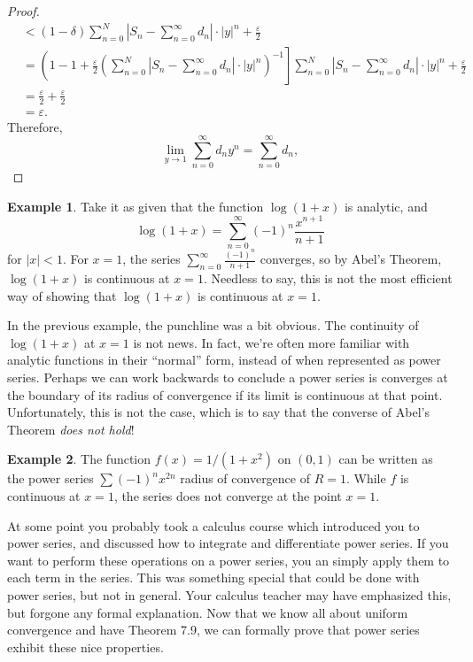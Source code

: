 \documentclass{article}
\theoremstyle{definition}
\newtheorem{example}{Example}[section]
\begin{document}
\begin{proof}
\begin{align*}
			&< (1-\delta)\sum_{n=0}^{N}\left\lvert S_n-\sum_{n=0}^{\infty}d_n \right\rvert\cdot|y|^n + \frac{\varepsilon}{2}\\
			& = \left(1-1 + \frac{\varepsilon}{2}\left(\sum_{n=0}^{N}\left\lvert S_n-\sum_{n=0}^{\infty}d_n \right\rvert\cdot|y|^n\right)^{-1}\right]\sum_{n=0}^{N}\left\lvert S_n-\sum_{n=0}^{\infty}d_n \right\rvert\cdot|y|^n + \frac{\varepsilon}{2}\\ & = 
			\frac{\varepsilon}{2} + \frac{\varepsilon}{2}\\
			& = \varepsilon.
		\end{align*}
		Therefore, $$ \lim\limits_{y\to 1}\sum_{n=0}^{\infty}d_ny^n= \sum_{n=0}^{\infty}d_n,$$
	\end{proof}
	
	\begin{example}
		Take it as given that the function $ \log(1+x) $ is analytic, and $$ \log(1+x)=\sum_{n=0}^{\infty}(-1)^{n}\frac{x^{n+1}}{n+1}$$ for $ |x|<1 $. For $ x=1 $,  the series $\sum_{n=0}^{\infty}\frac{(-1)^{n}}{n+1}$ converges, so by Abel's Theorem, $ \log(1+x) $ is continuous at $ x = 1 $. Needless to say, this is not the most efficient way of showing that $ \log(1+x) $ is continuous at $ x = 1 $.   
	\end{example}
	
	In the previous example, the punchline was a bit obvious. The continuity of $ \log(1+x) $ at $ x = 1 $ is not news. In fact, we're often more familiar with analytic functions in their ``normal'' form, instead of when represented as power series. Perhaps we can work backwards to conclude a power series is converges at the boundary of its radius of convergence if its limit is continuous at that point. Unfortunately, this is not the case, which is to say that the converse of Abel's Theorem \textit{does not hold}! 
	
	\begin{example}
		The function $ f(x)= 1/(1+x^2) $ on $ (0,1) $ can be written as the power series $ \sum(-1)^nx^{2n}$ radius of convergence of $ R = 1 $. While $ f $ is continuous at $ x = 1 $, the series does not converge at the point $ x = 1 $.
	\end{example}
	
	At some point you probably took a calculus course which introduced you to power series, and discussed how to integrate and differentiate power series. If you want to perform these operations on a power series, you an simply apply them to each term in the series. This was something special that could be done with power series, but not in general. Your calculus teacher may have emphasized this, but forgone any formal explanation. Now that we know all about uniform convergence and have Theorem 7.9, we can formally prove that power series exhibit these nice properties.  
	
\end{document}
